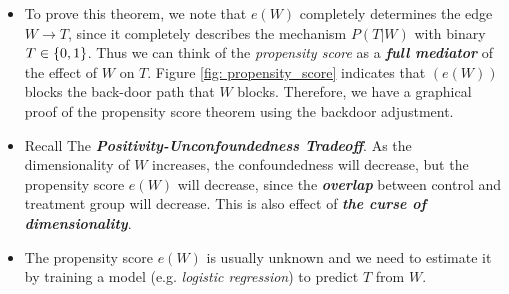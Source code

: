 \documentclass[11pt]{article}
\begin{document}
\begin{itemize}
\item To prove this theorem, we note that $e(W)$ completely determines the edge $W\rightarrow T$, since it completely describes the mechanism $P(T|W)$ with binary $T\in \left\{0,1\right\}$. Thus we can think of the \emph{propensity score} as a \emph{\textbf{full mediator}} of the effect of $W$ on $T$. Figure \ref{fig: propensity_score} indicates that $(e(W))$ blocks the back-door path that $W$ blocks. Therefore, we have a graphical proof of the propensity score theorem using the backdoor adjustment.

\item Recall The \emph{\textbf{Positivity-Unconfoundedness Tradeoff}}. As  the dimensionality of $W$ increases, the confoundedness will decrease, but the propensity score $e(W)$ will decrease, since the \emph{\textbf{overlap}} between control and treatment group will decrease. This is also effect of \emph{\textbf{the curse of dimensionality}}.

\item The propensity score $e(W)$ is usually unknown and we need to estimate it by training a model (e.g. \emph{logistic regression}) to predict $T$ from $W$.  
\end{itemize}
\end{document}
